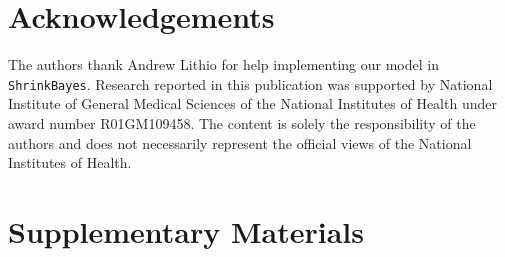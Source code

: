 \documentclass[useAMS,usenatbib,referee]{biom}
\begin{document}
\backmatter %



\section*{Acknowledgements}

The authors thank Andrew Lithio for help implementing our model in {\tt ShrinkBayes}. Research reported in this publication was supported by National Institute of General Medical Sciences of the National Institutes of Health under award number R01GM109458. The content is solely the responsibility of the authors and does not necessarily represent the official views of the National Institutes of Health.


\section*{Supplementary Materials}





\appendix


\section{}

%

\label{lastpage}
\end{document}
